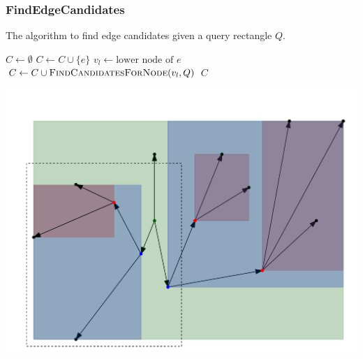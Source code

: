 \documentclass{beamer}
\newcommand{\findEdgeCandidates}{FindEdgeCandidates\xspace}
\begin{document}
\begin{frame}
	\frametitle{\findEdgeCandidates}
	\begin{algorithm}[H]
		\renewcommand{\thealgorithm}{}
		{\tiny
			\caption{The algorithm to find edge candidates given a query rectangle $Q$.}
			\begin{algorithmic}[1]
				\State $C \gets \emptyset$
				\State $C \gets C \cup \{e\}$
				\EndIf
				\State $v_l \gets \text{lower node of $e$}$
				\State $C \gets C \cup \Call{FindCandidatesForNode}{v_l, Q}$
				\EndIf
				\EndFor
				\State \Return $C$
				\EndProcedure
			\end{algorithmic}
		}
	\end{algorithm}
	\includegraphics[width=.45\columnwidth]{images/containedDowngraphBox}
\end{frame}
\end{document}
